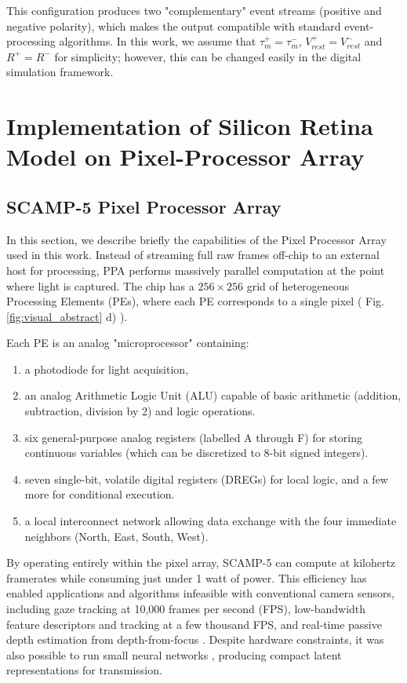\documentclass{article}
\begin{document}
This configuration produces two "complementary" event streams (positive and negative polarity), which makes the output compatible with standard event-processing algorithms. In this work, we assume that $\tau_{m}^+ = \tau_{m}^{-}
$, $V_{rest}^{+} =V_{rest}^{-}$ and $R^{+}=R^{-}$ for simplicity; however, this can be changed easily in the digital simulation framework.



\section{Implementation of Silicon Retina Model on Pixel-Processor Array}

\subsection{SCAMP-5 Pixel Processor Array}
\label{sec:scamp5_hardware}
In this section, we describe briefly the capabilities of the Pixel Processor Array used in this work. Instead of streaming full raw frames off-chip to an external host for processing, PPA performs massively parallel computation at the point where light is captured.  The chip has a $256 \times 256$ grid of heterogeneous Processing Elements (PEs), where each PE corresponds to a single pixel ( Fig. \ref{fig:visual_abstract} d) ).

Each PE is an analog "microprocessor" containing:
\begin{enumerate}
    \item a photodiode for light acquisition,
    \item an analog Arithmetic Logic Unit (ALU) capable of basic arithmetic (addition, subtraction, division by 2) and logic operations.
    \item six general-purpose analog registers (labelled A through F) for storing continuous variables (which can be discretized to 8-bit signed integers).
    \item seven single-bit, volatile digital registers (DREGs) for local logic, and a few more for conditional execution.
    \item a local interconnect network allowing data exchange with the four immediate neighbors (North, East, South, West).
\end{enumerate}

By operating entirely within the pixel array, SCAMP-5 can compute at kilohertz framerates while consuming just under 1 watt of power. This efficiency has enabled applications and algorithms infeasible with conventional camera sensors, including gaze tracking \cite{bose_pixel_2022} at 10,000 frames per second (FPS), low-bandwidth feature descriptors and tracking \cite{chen_feature_nodate, bose_descriptor--pixel_nodate} at a few thousand FPS, and real-time passive depth estimation from depth-from-focus \cite{martel_real-time_2018}. Despite hardware constraints, it was also possible to run small neural networks \cite{so_pixelrnn_2023}, producing compact latent representations for transmission. 
\end{document}
